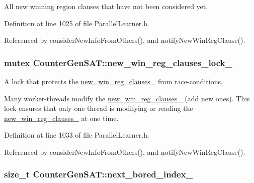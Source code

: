 All new winning region clauses that have not been considered yet. 



Definition at line 1025 of file Parallel\-Learner.\-h.



Referenced by consider\-New\-Info\-From\-Others(), and notify\-New\-Win\-Reg\-Clause().

\hypertarget{classCounterGenSAT_a120e7ea918e720bedb9b35a40e354307}{
\subsubsection[{new\-\_\-win\-\_\-reg\-\_\-clauses\-\_\-lock\-\_\-}]{\setlength{\rightskip}{0pt plus 5cm}mutex Counter\-Gen\-S\-A\-T\-::new\-\_\-win\-\_\-reg\-\_\-clauses\-\_\-lock\-\_\-\hspace{0.3cm}{\ttfamily [protected]}}}\label{classCounterGenSAT_a120e7ea918e720bedb9b35a40e354307}


A lock that protects the \hyperlink{classCounterGenSAT_a5a379bda175a32e3d4ccc0771fde024d}{new\-\_\-win\-\_\-reg\-\_\-clauses\-\_\-} from race-\/conditions. 

Many worker-\/threads modify the \hyperlink{classCounterGenSAT_a5a379bda175a32e3d4ccc0771fde024d}{new\-\_\-win\-\_\-reg\-\_\-clauses\-\_\-} (add new ones). This lock ensures that only one thread is modifying or reading the \hyperlink{classCounterGenSAT_a5a379bda175a32e3d4ccc0771fde024d}{new\-\_\-win\-\_\-reg\-\_\-clauses\-\_\-} at one time. 

Definition at line 1033 of file Parallel\-Learner.\-h.



Referenced by consider\-New\-Info\-From\-Others(), and notify\-New\-Win\-Reg\-Clause().

\hypertarget{classCounterGenSAT_a404764a6142a0cd55e1b3e40d2e0483b}{
\subsubsection[{next\-\_\-bored\-\_\-index\-\_\-}]{\setlength{\rightskip}{0pt plus 5cm}size\-\_\-t Counter\-Gen\-S\-A\-T\-::next\-\_\-bored\-\_\-index\-\_\-\hspace{0.3cm}{\ttfamily [protected]}}}\label{classCounterGenSAT_a404764a6142a0cd55e1b3e40d2e0483b}


